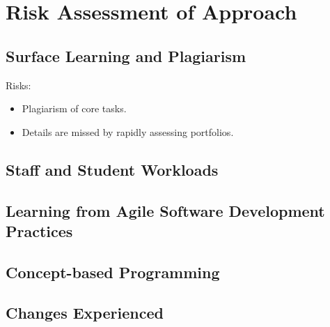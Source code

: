 \section{Risk Assessment of Approach} %
\label{sec:risk_assessment_of_approach}



\subsection{Surface Learning and Plagiarism} %
\label{sub:surface_learning_and_plagiarism}

Risks:
\begin{itemize}[noitemsep,nolistsep]
	\item Plagiarism of core tasks.
	\item Details are missed by rapidly assessing portfolios.
\end{itemize}


\subsection{Staff and Student Workloads} %
\label{sub:staff_and_student_workloads}








\subsection{Learning from Agile Software Development Practices} %
\label{sub:learning_from_agile_software_development_practices}


\subsection{Concept-based Programming} %
\label{sub:concept_based_programming}


\subsection{Changes Experienced} %
\label{sub:changes_experienced}

